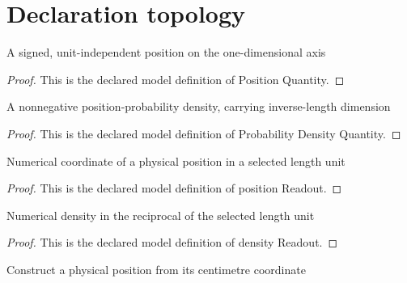 \section{Declaration topology}
\begin{definition}
  \label{def:physics:phyx-mini-0653:phyxminiproblems-problemphyxmini0653-positionquantity}
  A signed, unit-independent position on the one-dimensional axis
\end{definition}
\begin{proof}
  This is the declared model definition of Position Quantity.
\end{proof}
\begin{definition}
  \label{def:physics:phyx-mini-0653:phyxminiproblems-problemphyxmini0653-probabilitydensityquantity}
  A nonnegative position-probability density, carrying inverse-length dimension
\end{definition}
\begin{proof}
  This is the declared model definition of Probability Density Quantity.
\end{proof}
\begin{definition}
  \label{def:physics:phyx-mini-0653:phyxminiproblems-problemphyxmini0653-positionreadout}
  Numerical coordinate of a physical position in a selected length unit
\end{definition}
\begin{proof}
  This is the declared model definition of position Readout.
\end{proof}
\begin{definition}
  \label{def:physics:phyx-mini-0653:phyxminiproblems-problemphyxmini0653-densityreadout}
  Numerical density in the reciprocal of the selected length unit
\end{definition}
\begin{proof}
  This is the declared model definition of density Readout.
\end{proof}
\begin{definition}
  \label{def:physics:phyx-mini-0653:phyxminiproblems-problemphyxmini0653-positionfromcentimeters}
  Construct a physical position from its centimetre coordinate
\end{definition}
